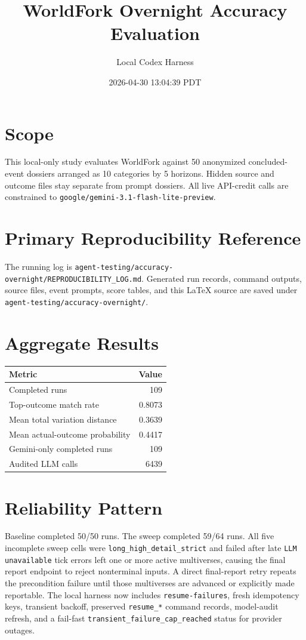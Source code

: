 \documentclass[11pt]{article}
\title{WorldFork Overnight Accuracy Evaluation}
\author{Local Codex Harness}
\date{2026-04-30 13:04:39 PDT}
\begin{document}
\maketitle

\section*{Scope}
This local-only study evaluates WorldFork against 50 anonymized concluded-event dossiers arranged as 10 categories by 5 horizons. Hidden source and outcome files stay separate from prompt dossiers. All live API-credit calls are constrained to \texttt{google/gemini-3.1-flash-lite-preview}.

\section*{Primary Reproducibility Reference}
The running log is \texttt{agent-testing/accuracy-overnight/REPRODUCIBILITY\_LOG.md}. Generated run records, command outputs, source files, event prompts, score tables, and this \LaTeX{} source are saved under \texttt{agent-testing/accuracy-overnight/}.

\section*{Aggregate Results}
\begin{tabular}{lr}
\toprule
Metric & Value \\
\midrule
Completed runs & 109 \\
Top-outcome match rate & 0.8073 \\
Mean total variation distance & 0.3639 \\
Mean actual-outcome probability & 0.4417 \\
Gemini-only completed runs & 109 \\
Audited LLM calls & 6439 \\
\bottomrule
\end{tabular}

\section*{Reliability Pattern}
Baseline completed 50/50 runs. The sweep completed 59/64 runs. All five incomplete sweep cells were \texttt{long\_high\_detail\_strict} and failed after late \texttt{LLM unavailable} tick errors left one or more active multiverses, causing the final report endpoint to reject nonterminal inputs. A direct final-report retry repeats the precondition failure until those multiverses are advanced or explicitly made reportable. The local harness now includes \texttt{resume-failures}, fresh idempotency keys, transient backoff, preserved \texttt{resume\_*} command records, model-audit refresh, and a fail-fast \texttt{transient\_failure\_cap\_reached} status for provider outages.
\end{document}

